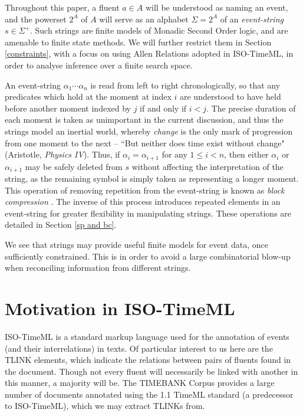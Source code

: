\documentclass[a4paper,11pt,leqno]{article}
\begin{document}
Throughout this paper, a fluent $a \in A$ will be understood as naming 
an event, and the powerset $2^{A}$ of $A$ will serve as an alphabet $\Sigma = 
2^{A}$ of an 
\textit{event-string} $s \in \Sigma^+$. Such strings are finite models of 
Monadic Second Order logic, and are amenable to finite state methods. We will 
further restrict them in Section \ref{constraints}, with a focus on using Allen 
Relations adopted in ISO-TimeML, in order to analyse inference over a finite 
search 
space.

An event-string $\alpha_1 \cdots \alpha_n$ is read from left to right 
chronologically, 
so that any predicates which hold at the moment at index $i$ are understood to 
have held before another moment indexed by $j$ if and only if $i < j$. The 
precise duration of each moment is taken as unimportant in the current 
discussion, 
and thus the strings model an inertial world, whereby \textit{change} is the 
only mark of progression from one moment to the next -- ``But neither does time 
exist without change" (Aristotle, \textit{Physics IV}). Thus, if $\alpha_i = 
\alpha_{i+1}$ for any 
$1 \leq i < n$, then either $\alpha_i$ or $\alpha_{i+1}$ may be safely deleted 
from $s$ without 
affecting the interpretation of the string, as the remaining symbol is simply 
taken as representing a longer moment. This operation of removing 
repetition from 
the event-string is known as \textit{block compression} 
\citep{fernando2016prior}. The inverse of this process introduces repeated 
elements in an event-string for greater flexibility in manipulating strings. 
These operations are detailed in Section \ref{sp and bc}.

We see that strings may provide useful finite models for event data, once 
sufficiently constrained. This is in order to avoid a large combinatorial 
blow-up when reconciling information from different strings.

\section{Motivation in ISO-TimeML}\label{motivation}
ISO-TimeML \citep{pustejovsky2010iso} is a standard markup language used for 
the annotation of events (and their interrelations) in texts. Of particular 
interest to us here are the TLINK elements, which indicate the relations 
between pairs of fluents found in the document. Though not every fluent will 
necessarily be linked with another in this manner, a majority will be. The 
TIMEBANK Corpus \citep{pustejovsky2003timebank} provides a large number of 
documents annotated using the 1.1 TimeML standard (a predecessor to 
ISO-TimeML), which we may extract TLINKs from.
\end{document}
